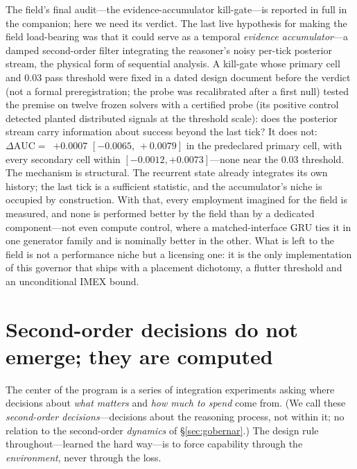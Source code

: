 \documentclass{article}
\newcommand{\NGunoDelta}{$+0.0007$} \newcommand{\NGunoIC}{$[-0.0065,\,+0.0079]$}
\begin{document}
The field's final audit---the evidence-accumulator kill-gate---is reported
in full in the companion; here we need its verdict. The last live
hypothesis for making the field load-bearing was that it could serve as a
temporal \emph{evidence accumulator}---a damped second-order filter integrating the
reasoner's noisy per-tick posterior stream, the physical form of sequential
analysis. A kill-gate whose primary cell and $0.03$ pass threshold were fixed
in a dated design document before the verdict (not a formal preregistration;
the probe was recalibrated after a first null) tested the premise on twelve frozen
solvers with a certified probe (its positive control detected planted
distributed signals at the threshold scale): does the posterior stream carry
information about success beyond the last tick? It does not:
$\Delta\mathrm{AUC}=$~\NGunoDelta{} \NGunoIC{} in the predeclared primary
cell, with every secondary cell within $[-0.0012,+0.0073]$---none near the
$0.03$ threshold. The mechanism is structural. The recurrent state already
integrates its own history; the last tick is a sufficient statistic, and the
accumulator's niche is occupied by construction. With that, every employment
imagined for the field is measured, and none is performed better by the
field than by a dedicated component---not even compute control, where a
matched-interface GRU ties it in one generator family and is nominally better
in the other. What is left to the field is not a performance niche but a
licensing one: it is the only implementation of this governor that ships with
a placement dichotomy, a flutter threshold and an unconditional IMEX bound.

\section{Second-order decisions do not emerge; they are computed}
\label{sec:decidir}

The center of the program is a series of integration experiments asking where
decisions about \emph{what matters} and \emph{how much to spend} come from.
(We call these \emph{second-order decisions}---decisions about the
reasoning process, not within it; no relation to the second-order
\emph{dynamics} of \S\ref{sec:gobernar}.)
The design rule throughout---learned the hard way---is to force capability
through the \emph{environment}, never through the loss.
\end{document}
